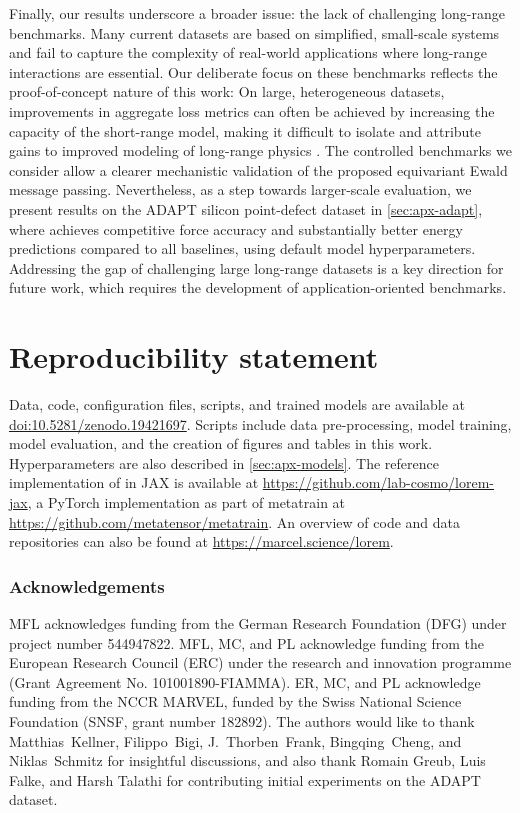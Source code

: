 \documentclass[10pt]{article}
\begin{document}
Finally, our results underscore a broader issue: the lack of challenging long-range benchmarks. Many current datasets are based on simplified, small-scale systems and fail to capture the complexity of real-world applications where long-range interactions are essential. Our deliberate focus on these benchmarks reflects the proof-of-concept nature of this work: On large, heterogeneous datasets, improvements in aggregate loss metrics can often be achieved by increasing the capacity of the short-range model, making it difficult to isolate and attribute gains to improved modeling of long-range physics \citep{hlhc2023}. The controlled benchmarks we consider allow a clearer mechanistic validation of the proposed equivariant Ewald message passing. Nevertheless, as a step towards larger-scale evaluation, we present results on the ADAPT silicon point-defect dataset \citep{dxzhrjk2025pre} in \cref{sec:apx-adapt}, where \lorem achieves competitive force accuracy and substantially better energy predictions compared to all baselines, using default model hyperparameters.
Addressing the gap of challenging large long-range datasets is a key direction for future work, which requires the development of application-oriented benchmarks.

\section*{Reproducibility statement}
\noindent
Data, code, configuration files, scripts, and trained models are available at \href{https://doi.org/10.5281/zenodo.19421697}{doi:10.5281/zenodo.19421697}. Scripts include data pre-processing, model training, model evaluation, and the creation of figures and tables in this work. Hyperparameters are also described in \cref{sec:apx-models}.
The reference implementation of \lorem in JAX is available at \url{https://github.com/lab-cosmo/lorem-jax}, a PyTorch implementation as part of metatrain \citep{balmtlgpcgfckcf2026} at \url{https://github.com/metatensor/metatrain}.
An overview of code and data repositories can also be found at \url{https://marcel.science/lorem}.

\subsubsection*{Acknowledgements}

MFL acknowledges funding from the German Research Foundation (DFG) under project number 544947822.
MFL, MC, and PL acknowledge funding from the European Research Council (ERC) under the research and innovation programme (Grant Agreement No. 101001890-FIAMMA). ER, MC, and PL acknowledge funding from the NCCR MARVEL, funded by the Swiss National Science Foundation (SNSF, grant  number 182892).
The authors would like to thank Matthias~Kellner, Filippo~Bigi, J.~Thorben~Frank, Bingqing~Cheng, and Niklas~Schmitz for insightful discussions, and also thank Romain Greub, Luis Falke, and Harsh Talathi for contributing initial experiments on the ADAPT dataset.
\end{document}
